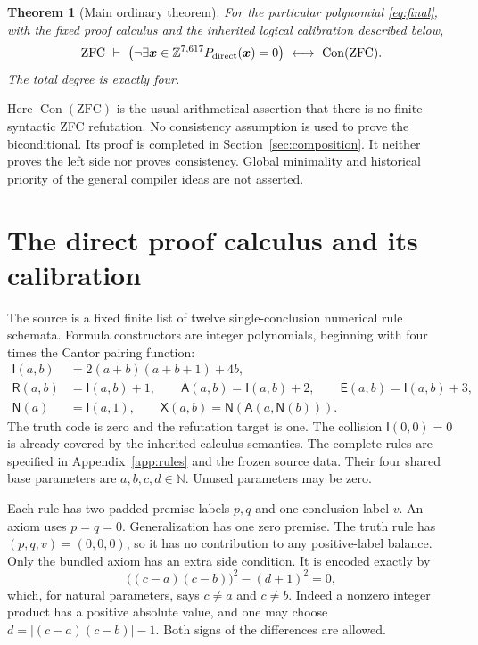 \documentclass[11pt,a4paper]{article}
\newtheorem{theorem}{Theorem}[section]
\theoremstyle{definition}\newtheorem{definition}[theorem]{Definition}
\theoremstyle{remark}\newtheorem{remark}[theorem]{Remark}
\newcommand{\N}{\mathbb N}\newcommand{\Z}{\mathbb Z}\newcommand{\Q}{\mathbb Q}
\newcommand{\Con}{\operatorname{Con}}\newcommand{\Refut}{\operatorname{Ref}}
\newcommand{\Imp}{\mathsf I}\newcommand{\Rel}{\mathsf R}\newcommand{\All}{\mathsf A}
\newcommand{\Eq}{\mathsf E}\newcommand{\Neg}{\mathsf N}\newcommand{\Ex}{\mathsf X}
\numberwithin{equation}{section}
\begin{document}
\begin{theorem}[Main ordinary theorem]\label{thm:main}
For the particular polynomial \eqref{eq:final}, with the fixed proof
calculus and the inherited logical calibration described below,
\begin{equation}
\mathrm{ZFC}\ \vdash\
\left(\neg\exists\boldsymbol{x}\in\Z^{\FinalVars}
              P_{\rm direct}(\boldsymbol{x})=0\right)
 \ \longleftrightarrow\ \Con(\mathrm{ZFC}).
\label{eq:main}
\end{equation}
The total degree is exactly four.
\end{theorem}

Here \(\Con(\mathrm{ZFC})\) is the usual arithmetical assertion that
there is no finite syntactic ZFC refutation. No consistency assumption is
used to prove the biconditional. Its proof is completed in
Section~\ref{sec:composition}. It neither proves the left side nor proves
consistency. Global minimality and historical priority of the general
compiler ideas are not asserted.

\section{The direct proof calculus and its calibration}
\label{sec:calculus}

The source is a fixed finite list of twelve single-conclusion numerical
rule schemata. Formula constructors are integer polynomials, beginning
with four times the Cantor pairing function:
\begin{align}
\Imp(a,b)&=2(a+b)(a+b+1)+4b,\nonumber\\
\Rel(a,b)&=\Imp(a,b)+1,\qquad
\All(a,b)=\Imp(a,b)+2,\qquad
\Eq(a,b)=\Imp(a,b)+3,\nonumber\\
\Neg(a)&=\Imp(a,1),\qquad
\Ex(a,b)=\Neg(\All(a,\Neg(b))).
\label{eq:constructors}
\end{align}
The truth code is zero and the refutation target is one. The collision
\(\Imp(0,0)=0\) is already covered by the inherited calculus semantics.
The complete rules are specified in Appendix~\ref{app:rules} and the
frozen source data. Their four shared base parameters are
\(a,b,c,d\in\N\). Unused parameters may be zero.

Each rule has two padded premise labels \(p,q\) and one conclusion label
\(v\). An axiom uses \(p=q=0\). Generalization has one zero premise.
The truth rule has \((p,q,v)=(0,0,0)\), so it has no contribution to any
positive-label balance. Only the bundled axiom has an extra side
condition. It is encoded exactly by
\begin{equation}
 \big((c-a)(c-b)\big)^2-(d+1)^2=0,
\label{eq:bundle-side}
\end{equation}
which, for natural parameters, says \(c\ne a\) and \(c\ne b\).
Indeed a nonzero integer product has a positive absolute value, and one
may choose \(d=|(c-a)(c-b)|-1\). Both signs of the differences are allowed.
\end{document}

